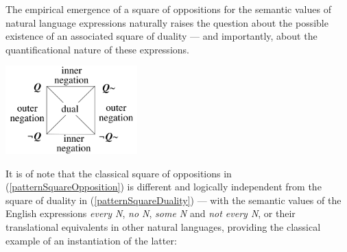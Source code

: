 \documentclass[output=paper
,modfonts
,nonflat]{langsci/langscibook}
\begin{document}
The empirical
emergence of a square of oppositions for the semantic values of natural
language expressions naturally raises the question about the possible
existence of an associated square of duality --- and importantly,
about the quantificational nature of these expressions. 




\begin{exe}
\ex
\label{patternSquareDuality}
\end{exe}
\vspace{-7mm}
\centerline{\includegraphics[width=12pc]{figures/patternSquareDuality.pdf}}


It is of note that 
the classical square of oppositions in (\ref{patternSquareOpposition})
is different and logically independent from
the square of duality in (\ref{patternSquareDuality}) --- with the semantic values of the English 
expressions \emph{every N}, \emph{no N},
\emph{some N} and \emph{not every N}, or their translational equivalents in
other natural languages, providing the classical example of an instantiation
of the latter:
\end{document}
